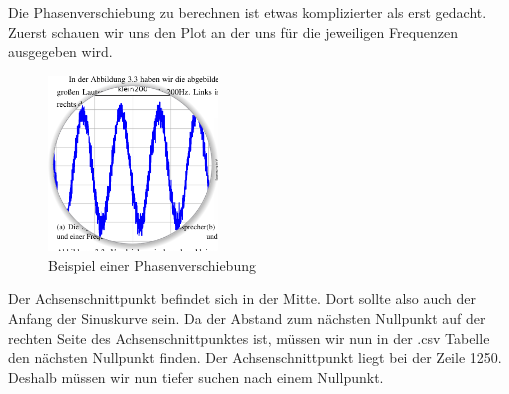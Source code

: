 \documentclass[12pt, oneside, a4paper, \docLanguage]{report}
\begin{document}
\newpage

Die Phasenverschiebung zu berechnen ist etwas komplizierter als erst gedacht.
Zuerst schauen wir uns den Plot an der uns für die jeweiligen Frequenzen ausgegeben wird.


\begin{figure}[H]
	\centering\small
	\includegraphics[width=0.4\textwidth]{media/phase.png}
	\caption{Beispiel einer Phasenverschiebung}
	\label{img:Beispiel einer Phasenverschiebung}
\end{figure}

Der Achsenschnittpunkt befindet sich in der Mitte. Dort sollte also auch der Anfang der Sinuskurve sein. Da der Abstand zum nächsten Nullpunkt auf der rechten Seite des Achsenschnittpunktes ist, müssen wir nun in der .csv Tabelle den nächsten Nullpunkt finden.
\newline 
Der Achsenschnittpunkt liegt bei der Zeile 1250. Deshalb müssen wir nun tiefer suchen nach einem Nullpunkt.
\end{document}
